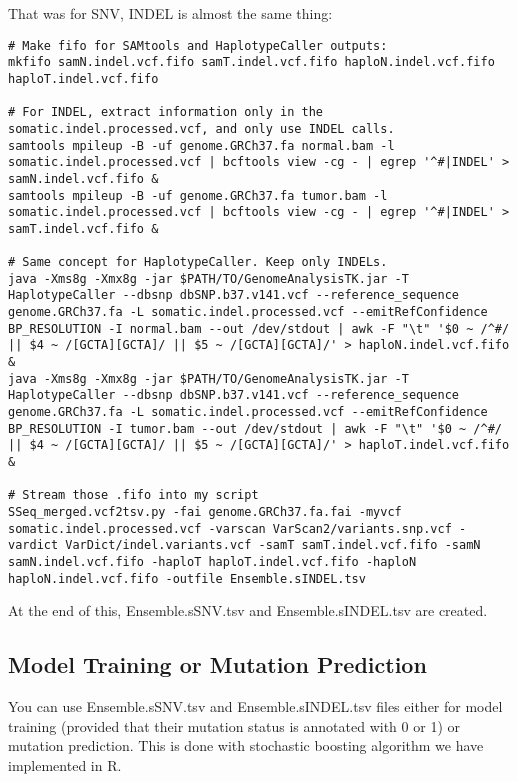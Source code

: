 \documentclass[10pt,letterpaper]{article}
\begin{document}
\begin{sloppypar}
That was for SNV, INDEL is almost the same thing:

\begin{lstlisting}
# Make fifo for SAMtools and HaplotypeCaller outputs:
mkfifo samN.indel.vcf.fifo samT.indel.vcf.fifo haploN.indel.vcf.fifo haploT.indel.vcf.fifo

# For INDEL, extract information only in the somatic.indel.processed.vcf, and only use INDEL calls.
samtools mpileup -B -uf genome.GRCh37.fa normal.bam -l somatic.indel.processed.vcf | bcftools view -cg - | egrep '^#|INDEL' > samN.indel.vcf.fifo &
samtools mpileup -B -uf genome.GRCh37.fa tumor.bam -l somatic.indel.processed.vcf | bcftools view -cg - | egrep '^#|INDEL' > samT.indel.vcf.fifo &

# Same concept for HaplotypeCaller. Keep only INDELs.
java -Xms8g -Xmx8g -jar $PATH/TO/GenomeAnalysisTK.jar -T HaplotypeCaller --dbsnp dbSNP.b37.v141.vcf --reference_sequence genome.GRCh37.fa -L somatic.indel.processed.vcf --emitRefConfidence BP_RESOLUTION -I normal.bam --out /dev/stdout | awk -F "\t" '$0 ~ /^#/ || $4 ~ /[GCTA][GCTA]/ || $5 ~ /[GCTA][GCTA]/' > haploN.indel.vcf.fifo &
java -Xms8g -Xmx8g -jar $PATH/TO/GenomeAnalysisTK.jar -T HaplotypeCaller --dbsnp dbSNP.b37.v141.vcf --reference_sequence genome.GRCh37.fa -L somatic.indel.processed.vcf --emitRefConfidence BP_RESOLUTION -I tumor.bam --out /dev/stdout | awk -F "\t" '$0 ~ /^#/ || $4 ~ /[GCTA][GCTA]/ || $5 ~ /[GCTA][GCTA]/' > haploT.indel.vcf.fifo &

# Stream those .fifo into my script		
SSeq_merged.vcf2tsv.py -fai genome.GRCh37.fa.fai -myvcf somatic.indel.processed.vcf -varscan VarScan2/variants.snp.vcf -vardict VarDict/indel.variants.vcf -samT samT.indel.vcf.fifo -samN samN.indel.vcf.fifo -haploT haploT.indel.vcf.fifo -haploN haploN.indel.vcf.fifo -outfile Ensemble.sINDEL.tsv
\end{lstlisting}


At the end of this, Ensemble.sSNV.tsv and Ensemble.sINDEL.tsv are created. 



\subsection{Model Training or Mutation Prediction}

You can use Ensemble.sSNV.tsv and Ensemble.sINDEL.tsv files either for model training (provided that their mutation status is annotated with 0 or 1) or mutation prediction. This is done with stochastic boosting algorithm we have implemented in R. 
	

\end{sloppypar}
\end{document}

